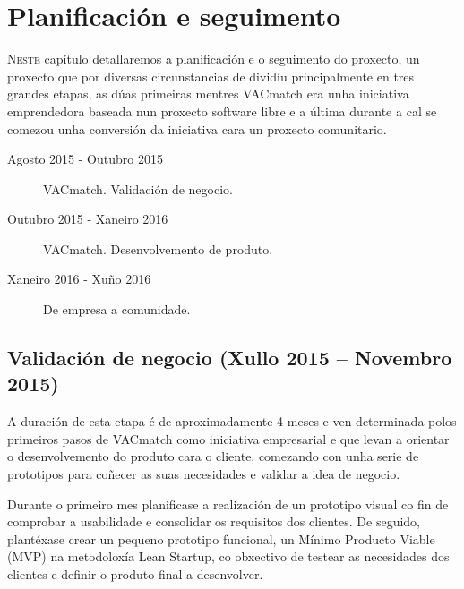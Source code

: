 \chapter{Planificación e seguimento}
\minitoc


  \lettrine{N}{este} capítulo detallaremos a planificación e o seguimento 
do proxecto, un proxecto que por diversas circunstancias de dividíu 
principalmente en tres grandes etapas, as dúas primeiras mentres VACmatch era 
unha iniciativa emprendedora baseada nun proxecto software libre e a última 
durante a cal se comezou unha conversión da iniciativa cara un proxecto 
comunitario.


  \begin{description}
    \item [Agosto 2015 - Outubro 2015] VACmatch. Validación de negocio.
    \item [Outubro 2015 - Xaneiro 2016] VACmatch. Desenvolvemento de produto.
    \item [Xaneiro 2016 - Xuño 2016] De empresa a comunidade.
  \end{description}


  \section{Validación de negocio (Xullo 2015 -- Novembro 2015)}
  A duración de esta etapa é de aproximadamente 4 meses e ven determinada polos 
primeiros pasos de VACmatch como iniciativa empresarial e que levan a orientar 
o desenvolvemento do produto cara o cliente, comezando con unha serie de 
prototipos para coñecer as suas necesidades e validar a idea de 
negocio.

  Durante o primeiro mes planificase a realización de un prototipo visual co 
fin de comprobar a usabilidade e consolidar os requisitos dos clientes.
  De seguido, plantéxase crear un pequeno prototipo funcional, un Mínimo 
Producto Viable (MVP) na metodoloxía Lean Startup, co obxectivo de testear as 
necesidades dos clientes e definir o produto final a desenvolver.

